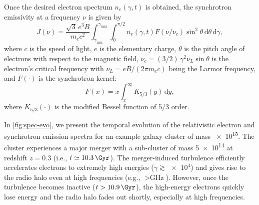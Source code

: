 \documentclass[twocolumn]{aastex62}
\newcommand{\R}[1]{\mathrm{#1}}
\newcommand{\D}[1]{\R{d} #1}
\newcommand{\editone}[1]{{\leavevmode\color{cyan}#1}}
\begin{document}
Once the desired electron spectrum $n_e(\gamma, t)$ is obtained, the
synchrotron emissivity at a frequency $\nu$ is given by \citep{rybicki1979}
\begin{equation}
  \label{sec:jnu-sync}
  J(\nu) = \frac{\sqrt{3} \, e^3 B}{m_e c^2}
    \!\int_{\gamma_{\R{min}}}^{\gamma_{\R{max}}} \!\!\!\int_0^{\pi/2}\!
    n_e(\gamma, t) F(\nu/\nu_c) \sin^2 \!\theta \,\D{\theta} \,\D{\gamma},
\end{equation}
where
$c$ is the speed of light,
$e$ is the elementary charge,
$\theta$ is the pitch angle of electrons with respect to the magnetic
field, $\nu_c = (3/2) \,\gamma^2 \nu_L \sin\theta$ is the electron's
critical frequency with $\nu_L = e B / (2\pi m_e c)$ being the Larmor
frequency, and $F(\cdot)$ is the synchrotron kernel:
\begin{equation}
  \label{eq:sync-kernel}
  F(x) = x \int_x^{\infty} K_{5/3}(y) \,\D{y} ,
\end{equation}
where $K_{5/3}(\cdot)$ is the modified Bessel function of 5/3 order.

\editone{%
In \autoref{fig:spec-evo}, we present the temporal evolution of the
relativistic electron and synchrotron emission spectra for an example
galaxy cluster of mass \SI{e15}{\solarmass}.
The cluster experiences a major merger with a sub-cluster of mass
\SI{5e14}{\solarmass} at redshift $z = 0.3$
(i.e., $t \simeq \SI{10.3}{\Gyr}$).
The merger-induced turbulence efficiently accelerates electrons to
extremely high energies ($\gamma \gtrsim \num{e4}$) and gives rise to the
radio halo even at high frequencies (e.g., $> \si{\GHz}$).
However, once the turbulence becomes inactive ($t > \SI{10.9}{\Gyr}$), the
high-energy electrons quickly lose energy and the radio halo fades out
shortly, especially at high frequencies.
}
\end{document}
